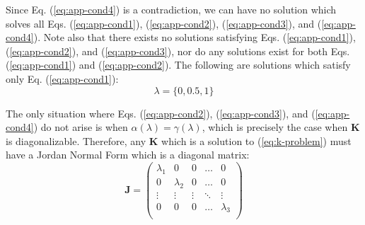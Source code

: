 \documentclass{article}
\theoremstyle{plain}
\theoremstyle{definition}
\theoremstyle{remark}
\newcommand{\vA}{\mathbf{A}}
\newcommand{\vJ}{\mathbf{J}}
\newcommand{\vK}{\mathbf{K}}
\begin{document}
Since Eq. (\ref{eq:app-cond4}) is a contradiction, we can have no solution which solves all Eqs. (\ref{eq:app-cond1}), (\ref{eq:app-cond2}), (\ref{eq:app-cond3}), and (\ref{eq:app-cond4}). Note also that there exists no solutions satisfying Eqs. (\ref{eq:app-cond1}), (\ref{eq:app-cond2}), and (\ref{eq:app-cond3}), nor do any solutions exist for both Eqs. (\ref{eq:app-cond1}) and (\ref{eq:app-cond2}). The following are solutions which satisfy only Eq. (\ref{eq:app-cond1}):
\begin{equation*}
    \lambda =\{0, 0.5, 1\}
\end{equation*}

The only situation where Eqs. (\ref{eq:app-cond2}), (\ref{eq:app-cond3}), and (\ref{eq:app-cond4}) do not arise is when $\alpha(\lambda)=\gamma(\lambda)$, which is precisely the case when $\vK$ is diagonalizable. Therefore, any $\vK$ which is a solution to (\ref{eq:k-problem}) must have a Jordan Normal Form which is a diagonal matrix:
\begin{equation*}
    \vJ = \begin{pmatrix}
        \lambda_1 & 0         & 0      & \hdots & 0         \\
        0         & \lambda_2 & 0      & \hdots & 0         \\
        \vdots    & \vdots    & \vdots & \ddots & \vdots    \\
        0         & 0         & 0      & \hdots & \lambda_3 \\
    \end{pmatrix}
\end{equation*}

\end{document}
